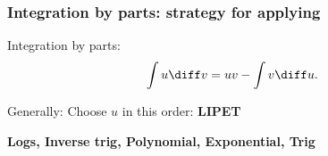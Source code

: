 \begin{frame}
\frametitle{Integration by parts: strategy for applying}
Integration by parts:
\belowdisplayskip=0pt
\abovedisplayskip=0pt
\[
\int u\diff v = uv - \int v\diff u.
\]

\begin{center}
Generally: Choose $u$ in this order: {\Large \textbf{  LIPET}}
\end{center}
\pause

\begin{center}
{\Large \textbf{  Logs, Inverse trig, Polynomial, Exponential, Trig
}}
\end{center}
\end{frame}